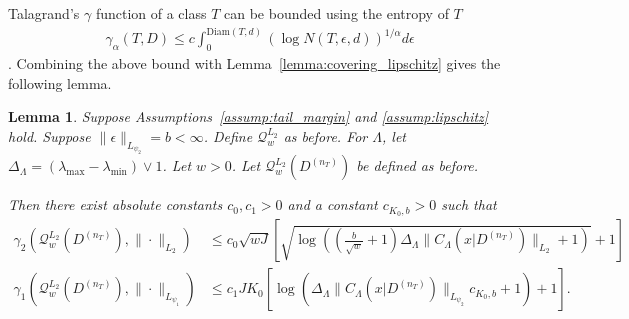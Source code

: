 \documentclass[10pt]{book}
\newtheorem{lemma}{Lemma}
\theoremstyle{definition}
\begin{document}
Talagrand's $\gamma$ function of a class $T$ can be bounded using the entropy of $T$
\begin{align}
\gamma_{\alpha}(T,D)\le c\int_{0}^{\text{Diam}(T,d)}\left(\log N(T,\epsilon,d)\right)^{1/\alpha}d\epsilon
\label{eq:bound_gamma}
\end{align}
\citep{talagrand2006generic}.
Combining the above bound with Lemma~\ref{lemma:covering_lipschitz} gives the following lemma.

\begin{lemma}
Suppose Assumptions~\ref{assump:tail_margin} and \ref{assump:lipschitz} hold.
Suppose $\|\epsilon\|_{L_{\psi_2}} = b < \infty$.
Define $\mathcal{Q}_w^{L_2}$ as before.
For $\Lambda$, let $\Delta_{\Lambda}=(\lambda_{\max}-\lambda_{\min}) \vee 1$.
Let $w>0$.
Let $\mathcal{Q}_{w}^{L_{2}}(D^{(n_{T})})$ be defined as before.

Then there exist absolute constants $c_0, c_1 >0$ and a constant $c_{K_0, b} > 0$ such that
\begin{align}
\gamma_{2}\left(\mathcal{Q}_{w}^{L_{2}}(D^{(n_{T})}),\|\cdot\|_{L_{2}}\right)
& \le	c_0 \sqrt{w J}
\left[\sqrt{
\log\left(
\left (\frac{b}{\sqrt{w}} + 1 \right )
\Delta_{\Lambda}\|C_\Lambda(x|D^{(n_{T})})\|_{L_{2}} + 1
\right)
}
+1\right]\\
\gamma_{1}\left(\mathcal{Q}_{w}^{L_{2}}(D^{(n_{T})}),\|\cdot\|_{L_{\psi_{1}}}\right)
& \le c_{1}JK_0\left[
\log\left(
	\Delta_{\Lambda}\|C_\Lambda(x|D^{(n_{T})})\|_{L_{\psi_{2}}} c_{K_0, b} +1
\right)
+1\right].
\end{align}
\end{lemma}
\end{document}
